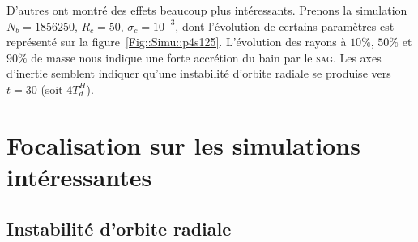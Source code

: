 	D'autres ont montré des effets beaucoup plus intéressants. Prenons la simulation $N_b = 1856250$, $R_c = 50$, $\sigma_c = 10^{-3}$, dont
	l'évolution de certains paramètres est représenté sur la figure~\ref{Fig::Simu::p4s125}. L'évolution des rayons à $10\%$, $50\%$ et $90\%$ de
	masse nous indique une forte accrétion du bain par le \textsc{sag}. Les axes d'inertie semblent indiquer qu'une instabilité d'orbite radiale
	se produise vers $t=30$ (soit $4T_d^H$).




\section{Focalisation sur les simulations intéressantes}

	\subsection{Instabilité d'orbite radiale}

